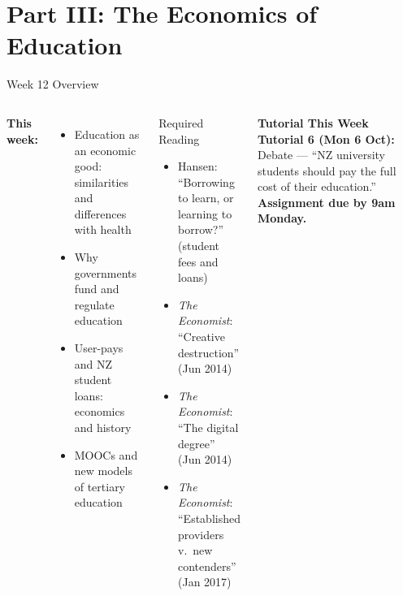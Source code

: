 \documentclass[aspectratio=169, 12pt]{beamer}
\newcommand{\tutorialbox}[1]{%
  \begin{block}{\textbf{Tutorial This Week}}
    #1
  \end{block}}
\begin{document}
\section{Part III: The Economics of Education}

\begin{frame}[plain]
\end{frame}

\begin{frame}{Week 12 Overview}
  \begin{columns}
      \textbf{This week:}
      \begin{itemize}
        \item Education as an economic good: similarities and differences with health
        \item Why governments fund and regulate education
        \item User-pays and NZ student loans: economics and history
        \item MOOCs and new models of tertiary education
      \end{itemize}
      \begin{block}{Required Reading}
        {\small
        \begin{itemize}
          \item Hansen: ``Borrowing to learn, or learning to borrow?'' (student fees and loans)
          \item \textit{The Economist}: ``Creative destruction'' (Jun 2014)
          \item \textit{The Economist}: ``The digital degree'' (Jun 2014)
          \item \textit{The Economist}: ``Established providers v.\ new contenders'' (Jan 2017)
        \end{itemize}}
      \end{block}
      \vspace{0.2em}
      \tutorialbox{\textbf{Tutorial 6 (Mon 6 Oct):} Debate --- ``NZ university students should pay the full cost of their education.'' \textbf{Assignment due by 9am Monday.}}
  \end{columns}
\end{frame}
\end{document}
